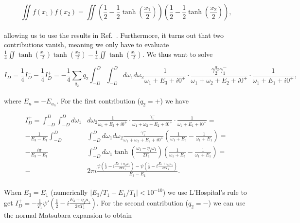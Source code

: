 \documentclass{article}
\begin{document}
\begin{equation}
    \iint f(x_1)f(x_2) = \iint \left(\frac{1}{2}-\frac{1}{2}\tanh\left(\frac{x_1}{2}\right)\right)\left(\frac{1}{2}-\frac{1}{2}\tanh\left(\frac{x_2}{2}\right)\right),
\end{equation}
\\
allowing us to use the results in Ref.~\cite{gergs2018spin}. Furthermore, it turns out that two contributions vanish, meaning we only have to evaluate $\frac{1}{4}\iint \tanh\left(\frac{x_1}{2}\right)\tanh\left(\frac{x_2}{2}\right) - \frac{1}{4}\iint\tanh\left(\frac{x_1}{2}\right)$. We thus want to solve 

\begin{equation}
    I_D = \frac{1}{4}I_D^--\frac{1}{4}I_D^+ = -\frac{1}{4}\sum_{q_2}q_2 \int_{-D}^D\int_{-D}^Dd\omega_1d\omega_2\frac{1}{\omega_1+E_3+ i0^+}\cdot\frac{\gamma^{q_2}_2\gamma^{-}_1}{\omega_1 + \omega_2 + E_2 + i0^+}\cdot\frac{1}{\omega_1+E_1+i0^+},
\end{equation}
\\
where $E_n= -E_{a_n}$. For the first contribution ($q_2=+$) we have

\begin{equation}
\begin{split}
   I_D^+ =\int_{-D}^D\int_{-D}^Dd\omega_1&d\omega_2  \frac{1}{\omega_1+E_3+ i0^+}\cdot\frac{\gamma^{-}_1}{\omega_1 + \omega_2 + E_2 + i0^+}\cdot\frac{1}{\omega_1+E_1+i0^+} = \\ 
   - \frac{1}{E_3-E_1}\int_{-D}^D&\int_{-D}^Dd\omega_1d\omega_2\frac{\gamma^-_1}{\omega_1 + \omega_2 + E_2 + i0^+}\left( \frac{1}{\omega_1+E_3} -\frac{1}{\omega_1 + E_1} \right ) = \\ 
   -\frac{i\pi}{E_3-E_1}&\int_{-D}^D d\omega_1\tanh\left( \frac{\omega_1-\eta_1\omega_1}{2T_1}\right )\left ( \frac{1}{\omega_1+E_3}- \frac{1}{\omega_1+E_1}\right ) = \\
    -&2\pi i \frac{\psi\left(\frac{1}{2}-i\frac{E_3+\eta_1\mu_1}{2\pi T_1}\right)-\psi\left(\frac{1}{2}-i\frac{E_1+\eta_1\mu_1}{2\pi T_1}\right)}{E_3-E_1}.
    \end{split}
\end{equation}
\\
When $E_3=E_1$ (numerically $|E_3/T_1-E_1/T_1|<10^{-10}$) we use L'Hospital's rule to get $I_D^+=-\frac{1}{T_1}\psi'\left( \frac{1}{2}-i\frac{E_3+\eta_1\mu_1}{2\pi T_1} \right)$. For the second contribution ($q_2=-$) we can use the normal Matsubara expansion to obtain
\end{document}
